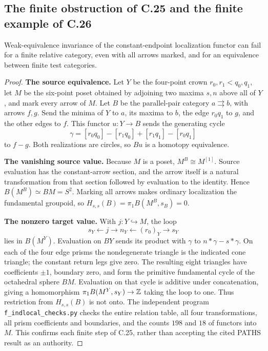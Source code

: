 \subsection{The finite obstruction of C.25 and the finite example of C.26}
\begin{proposition}\label{F:C25}
Weak-equivalence invariance of the constant-endpoint localization functor
can fail for a finite relative category, even with all arrows marked,
and for an equivalence between finite test categories.
\end{proposition}
\begin{proof}
\textbf{The source equivalence.} Let $Y$ be the four-point crown
$r_0,r_1<q_0,q_1$, let $M$ be the six-point poset obtained by adjoining
two maxima $s,n$ above all of $Y$, and mark every arrow of $M$.
Let $B$ be the parallel-pair category $a\rightrightarrows b$, with arrows
$f,g$. Send the minima of $Y$ to $a$, its maxima to $b$, the edge
$r_0q_1$ to $g$, and the other edges to $f$. This functor $u:Y\to B$
sends the generating cycle
\[
 \gamma=[r_0q_0]-[r_1q_0]+[r_1q_1]-[r_0q_1]
\]
to $f-g$. Both realizations are circles, so $Bu$ is a homotopy equivalence.

\textbf{The vanishing source value.} Because $M$ is a poset,
$M^B\cong M^{[1]}$. Source evaluation has the constant-arrow section,
and the arrow itself is a natural transformation from that section
followed by evaluation to the identity. Hence $B(M^B)\simeq BM=S^2$.
Marking all arrows makes ordinary localization the fundamental groupoid,
so $H_{s,s}(B)=\pi_1B(M^B,s_B)=0$.

\textbf{The nonzero target value.} With $j:Y\hookrightarrow M$, the loop
\[
 s_Y\longleftarrow j\longrightarrow n_Y
       \longleftarrow(r_0)_Y\longrightarrow s_Y
\]
lies in $B(M^Y)$. Evaluation on $BY$ sends its product with $\gamma$
to $n*\gamma-s*\gamma$. On each of the four edge prisms the nondegenerate
triangle is the indicated cone triangle; the constant return legs give
zero. The resulting eight triangles have coefficients $\pm1$, boundary
zero, and form the primitive fundamental cycle of the octahedral sphere
$BM$. Evaluation on that cycle is additive under concatenation, giving
a homomorphism $\pi_1B(M^Y,s_Y)\to\mathbb Z$ taking the loop to one.
Thus restriction from $H_{s,s}(B)$ is not onto. The independent program
\texttt{f\_indlocal\_checks.py} checks the entire relation table, all four
transformations, all prism coefficients and boundaries, and the counts
$198$ and $18$ of functors into $M$. This confirms each finite step of
C.25, rather than accepting the cited PATHS result as an authority.
\end{proof}

